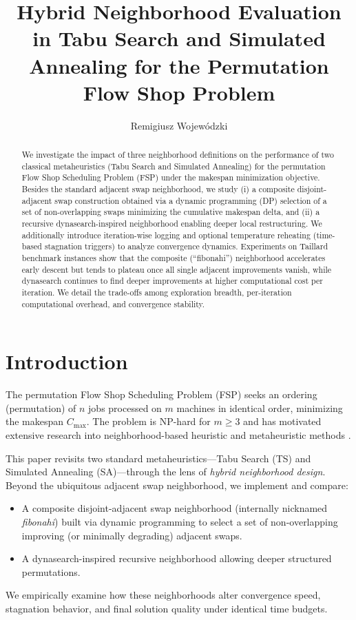 \documentclass[runningheads]{llncs}
\title{Hybrid Neighborhood Evaluation in Tabu Search and Simulated Annealing for the Permutation Flow Shop Problem}
\author{Remigiusz Wojewódzki\inst{1}}
\institute{Affiliation (To be completed) \\ \email{youremail@example.com}}
\begin{document}
\maketitle

\begin{abstract}
We investigate the impact of three neighborhood definitions on the performance of two classical metaheuristics (Tabu Search and Simulated Annealing) for the permutation Flow Shop Scheduling Problem (FSP) under the makespan minimization objective. Besides the standard adjacent swap neighborhood, we study (i) a composite disjoint-adjacent swap construction obtained via a dynamic programming (DP) selection of a set of non-overlapping swaps minimizing the cumulative makespan delta, and (ii) a recursive dynasearch-inspired neighborhood enabling deeper local restructuring. We additionally introduce iteration-wise logging and optional temperature reheating (time-based stagnation triggers) to analyze convergence dynamics. Experiments on Taillard benchmark instances show that the composite (``fibonahi'') neighborhood accelerates early descent but tends to plateau once all single adjacent improvements vanish, while dynasearch continues to find deeper improvements at higher computational cost per iteration. We detail the trade-offs among exploration breadth, per-iteration computational overhead, and convergence stability. 
\end{abstract}

\section{Introduction}
The permutation Flow Shop Scheduling Problem (FSP) seeks an ordering (permutation) of $n$ jobs processed on $m$ machines in identical order, minimizing the makespan $C_{\max}$. The problem is NP-hard for $m \ge 3$ and has motivated extensive research into neighborhood-based heuristic and metaheuristic methods \cite{ref_classic_fsp,ref_metaheuristics_survey}. 

This paper revisits two standard metaheuristics---Tabu Search (TS) and Simulated Annealing (SA)---through the lens of \emph{hybrid neighborhood design}. Beyond the ubiquitous adjacent swap neighborhood, we implement and compare:
\begin{itemize}
  \item A composite disjoint-adjacent swap neighborhood (internally nicknamed \emph{fibonahi}) built via dynamic programming to select a set of non-overlapping improving (or minimally degrading) adjacent swaps.
  \item A dynasearch-inspired recursive neighborhood allowing deeper structured permutations.
\end{itemize}
We empirically examine how these neighborhoods alter convergence speed, stagnation behavior, and final solution quality under identical time budgets.
\end{document}
